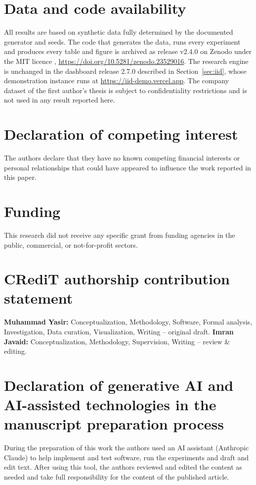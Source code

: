 \documentclass[preprint,12pt,authoryear]{elsarticle}
\newcommand{\demourl}{https://iid-demo.vercel.app}
\begin{document}
\section*{Data and code availability}
{\sloppy All results are based on synthetic data fully determined by the documented generator and seeds. The code that generates the data, runs every experiment and produces every table and figure is archived as release v2.4.0 on Zenodo under the MIT licence \citep{Yasir2026code}, \url{https://doi.org/10.5281/zenodo.23529016}. The research engine is unchanged in the dashboard release 2.7.0 described in Section~\ref{sec:iid}, whose demonstration instance runs at \url{\demourl}. The company dataset of the first author's thesis is subject to confidentiality restrictions and is not used in any result reported here.\par}

\section*{Declaration of competing interest}
The authors declare that they have no known competing financial interests or personal relationships that could have appeared to influence the work reported in this paper.

\section*{Funding}
This research did not receive any specific grant from funding agencies in the public, commercial, or not-for-profit sectors.

\section*{CRediT authorship contribution statement}
\textbf{Muhammad Yasir:} Conceptualization, Methodology, Software, Formal analysis, Investigation, Data curation, Visualization, Writing -- original draft. \textbf{Imran Javaid:} Conceptualization, Methodology, Supervision, Writing -- review \& editing.

\section*{Declaration of generative AI and AI-assisted technologies in the manuscript preparation process}
During the preparation of this work the authors used an AI assistant (Anthropic Claude) to help implement and test software, run the experiments and draft and edit text. After using this tool, the authors reviewed and edited the content as needed and take full responsibility for the content of the published article.

{\footnotesize\setlength{\itemsep}{0pt}

}
\end{document}
